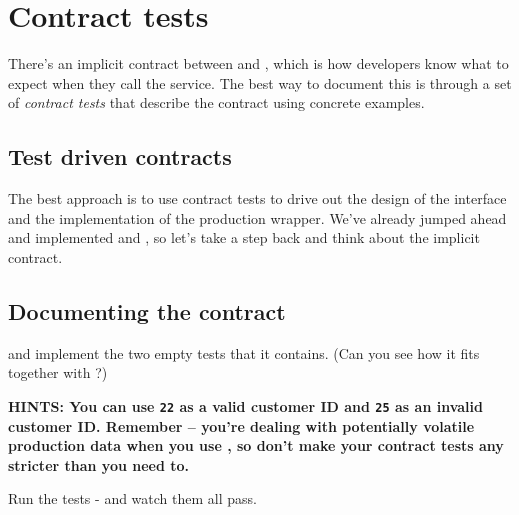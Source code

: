 \chapter*{Contract tests}

There's an implicit contract between \texttt{\ShoutyReportProcessor} and \texttt{\RevenueProviderInterface}, which is how developers know what to expect when they call the service. The best way to document this is through a set of \emph{contract tests} that describe the contract using concrete examples.

\section*{Test driven contracts}

\begin{sloppypar}
The best approach is to use contract tests to drive out the design of the interface and the implementation of the production wrapper. We've already jumped ahead and implemented \texttt{\RevenueProviderInterface} and \texttt{\ProductionRevenueProvider}, so let's take a step back and think about the implicit contract.
\end{sloppypar}



\section*{Documenting the contract}

  and implement the two empty tests that it contains. (Can you see how it fits together with \texttt{\ProductionRevenueProviderContractTests}?)


\begin{sloppypar}

\textbf{HINTS: You can use \texttt{22} as a valid customer ID and \texttt{25} as an invalid customer ID. Remember -- you're dealing with potentially volatile production data when you use \texttt{\ProductionRevenueProvider}, so don't make your contract tests any stricter than you need to.}

Run the tests - and watch them all pass.

\end{sloppypar}

